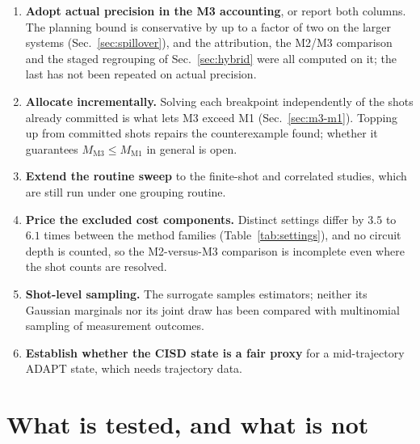 \documentclass[10pt]{article}
\begin{document}
\begin{enumerate}[leftmargin=2em]
  \item \textbf{Adopt actual precision in the M3 accounting}, or report both
  columns. The planning bound is conservative by up to a factor of two on the
  larger systems (Sec.~\ref{sec:spillover}), and the attribution, the M2/M3
  comparison and the staged regrouping of Sec.~\ref{sec:hybrid} were all computed
  on it; the last has not been repeated on actual precision.
  \item \textbf{Allocate incrementally.} Solving each breakpoint independently of
  the shots already committed is what lets M3 exceed M1 (Sec.~\ref{sec:m3-m1}).
  Topping up from committed shots repairs the counterexample found; whether it
  guarantees $M_{\mathrm{M3}}\le M_{\mathrm{M1}}$ in general is open.
  \item \textbf{Extend the routine sweep} to the finite-shot and correlated studies,
  which are still run under one grouping routine.
  \item \textbf{Price the excluded cost components.} Distinct settings differ by
  $3.5$ to $6.1$ times between the method families (Table~\ref{tab:settings}), and
  no circuit depth is counted, so the M2-versus-M3 comparison is incomplete even
  where the shot counts are resolved.
  \item \textbf{Shot-level sampling.} The surrogate samples estimators; neither its
  Gaussian marginals nor its joint draw has been compared with multinomial sampling
  of measurement outcomes.
  \item \textbf{Establish whether the CISD state is a fair proxy} for a
  mid-trajectory ADAPT state, which needs trajectory data.
\end{enumerate}

\section{What is tested, and what is not}
\label{sec:tests}
\end{document}
